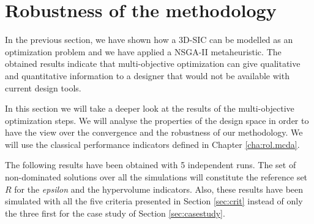 \section{Robustness of the methodology}
\label{sec:robustness}



In the previous section, we have shown how a 3D-SIC can be modelled as an optimization problem and we have applied a NSGA-II metaheuristic. The obtained results indicate that multi-objective optimization can give qualitative and quantitative information to a designer that would not be available with current design tools.

In this section we will take a deeper look at the results of the multi-objective optimization steps. We will analyse the properties of the design space in order to have the view over the convergence and the robustness of our methodology. We will use the classical performance indicators defined in Chapter \ref{cha:rol.mcda}.

The following results have been obtained with 5 independent runs. The set of non-dominated solutions over all the simulations will constitute the reference set $R$ for the \textit{epsilon} and the hypervolume indicators. Also, these results have been simulated with all the five criteria presented in Section \ref{sec:crit} instead of only the three first for the case study of Section \ref{sec:casestudy}.


